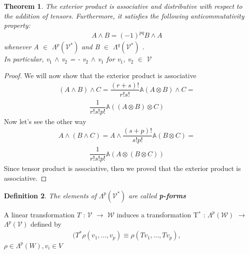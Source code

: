 \documentclass[12pt,a4paper]{article}
\newtheorem{thm}{Theorem}
\newtheorem{defn}[thm]{Definition}
\begin{document}
\begin{thm}
The exterior product is associative and distributive
with respect to the addition of tensors. Furthermore, it satisfies the
following anticommutativity property:
\begin{align*}
A \wedge B = (-1)^{pq}B\wedge A
\end{align*}
whenever A $\in$ $\Lambda^{p} (\mathcal{V}^*)$ and B $\in$ $\Lambda^{q} (\mathcal{V}^*)$ .  \\In particular, v$_1$ $\wedge$ v$_2$ =
   - v$_2$ $\wedge$ v$_1$ for v$_1$, v$_2$ $\in$ $\mathcal{V}$
\end{thm}

\begin{proof}
We will now show that the exterior product is associative
\begin{align*}
(A \wedge B) \wedge C = \dfrac{(r+s)!}{r!s!}\mathbb{A}(A \otimes B ) \wedge C =
\end{align*}
\begin{align*}
 \dfrac{1}{r!s!p!}\mathbb{A}((A \otimes B ) \otimes C)
\end{align*}
Now let's see the other way
\begin{align*}
A \wedge ( B \wedge C) =  A \wedge \dfrac{(s+p)!}{s!p!}\mathbb{A}(B \otimes C )   =
\end{align*}
\begin{align*}
 \dfrac{1}{r!s!p!}\mathbb{A}(A \otimes (B  \otimes C))
\end{align*}
Since tensor product is associative, then we proved that the exterior product is associative.
\end{proof}
\begin{defn}
The elements of $\Lambda^{p} (\mathcal{V}^*)$ are called \textbf{p-forms} 
\end{defn}
A linear transformation $T$ : $\mathcal{V}$ $\to$ $\mathcal{W}$ induces a transformation T$^*$ : $\Lambda^{p} (\mathcal{W})$  $\to$ $\Lambda^{p} (\mathcal{V})$ defined by
\begin{align*}
(T^{*} \rho (v_1,...,v_p) \equiv \rho (T v_1,...,T v_p) , 
\end{align*}
$\rho \in \Lambda^{p}(W), v_i \in V$
\\
\end{document}
